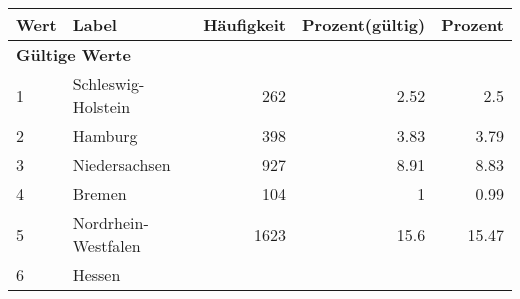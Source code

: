      \begin{longtable}{lXrrr}
     \toprule
     \textbf{Wert} & \textbf{Label} & \textbf{Häufigkeit} & \textbf{Prozent(gültig)} & \textbf{Prozent} \\
     \endhead
     \midrule
     \multicolumn{5}{l}{\textbf{Gültige Werte}}\\

     1 &
     \multicolumn{1}{X}{ Schleswig-Holstein   } &


       \num{262} &
       \num[round-mode=places,round-precision=2]{2,52} &
         \num[round-mode=places,round-precision=2]{2,5} \\

     2 &
     \multicolumn{1}{X}{ Hamburg   } &


       \num{398} &
       \num[round-mode=places,round-precision=2]{3,83} &
         \num[round-mode=places,round-precision=2]{3,79} \\

     3 &
     \multicolumn{1}{X}{ Niedersachsen   } &


       \num{927} &
       \num[round-mode=places,round-precision=2]{8,91} &
         \num[round-mode=places,round-precision=2]{8,83} \\

     4 &
     \multicolumn{1}{X}{ Bremen   } &


       \num{104} &
       \num[round-mode=places,round-precision=2]{1} &
         \num[round-mode=places,round-precision=2]{0,99} \\

     5 &
     \multicolumn{1}{X}{ Nordrhein-Westfalen   } &


       \num{1623} &
       \num[round-mode=places,round-precision=2]{15,6} &
         \num[round-mode=places,round-precision=2]{15,47} \\

     6 &
     \multicolumn{1}{X}{ Hessen   } &



\end{longtable}
